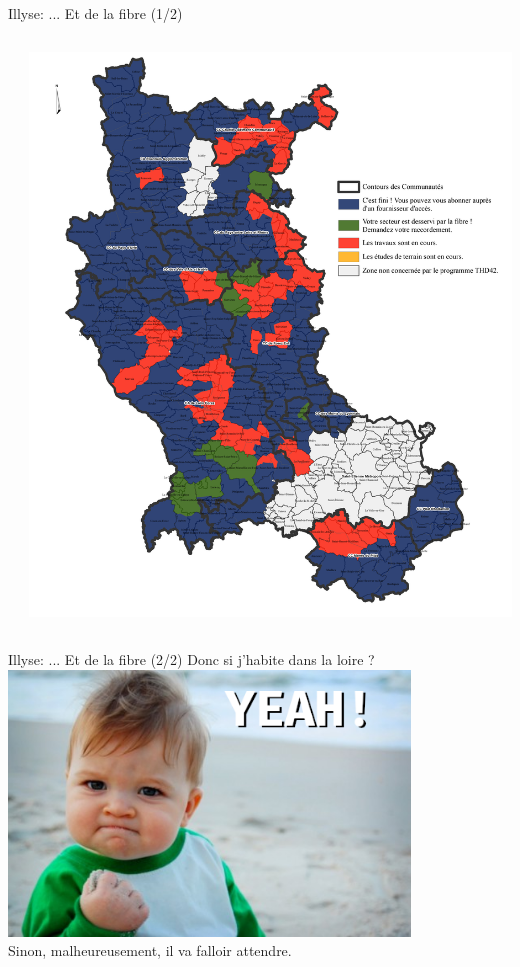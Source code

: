 \begin{frame}{Illyse: \hfill ... Et de la fibre (1/2)}
\begin{columns}
\begin{column}{0.5\textwidth}
    \end{column}
    \begin{column}{0.5\textwidth}
      \centering
      \includegraphics[width=\textwidth]{un_autre_internet/fibre_zone_dense.png}
    \end{column}
  \end{columns}
\end{frame}

\begin{frame}{Illyse: \hfill ... Et de la fibre (2/2)}
  \centering
  Donc si j'habite dans la loire ?
  \includegraphics[width=0.8\textwidth]{un_autre_internet/fibre_yeah.png} \\
  Sinon, malheureusement, il va falloir attendre.
\end{frame}


